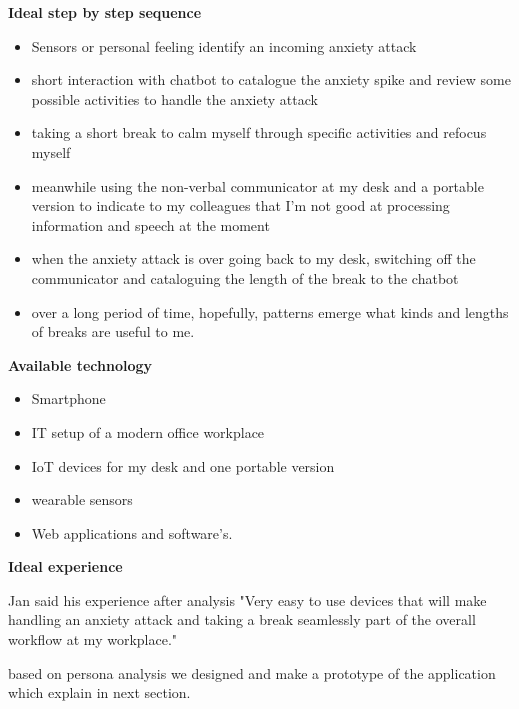 \textbf{Ideal step by step sequence}
\begin{itemize}
    \item Sensors or personal feeling identify an incoming anxiety attack 
    \item short interaction with chatbot to catalogue the anxiety spike and review some possible activities to handle the anxiety attack 
    \item taking a short break to calm myself through specific activities and refocus myself 
    \item meanwhile using the non-verbal communicator at my desk and a portable version to indicate to my colleagues that I’m not good at processing information and speech at the moment 
    \item when the anxiety attack is over going back to my desk, switching off the communicator and cataloguing the length of the break to the chatbot 
    \item over a long period of time, hopefully, patterns emerge what kinds and lengths of breaks are useful to me.
\end{itemize}
\textbf{Available technology}
\begin{itemize}
    \item Smartphone
    \item IT setup of a modern office workplace
    \item IoT devices for my desk and one portable version
    \item wearable sensors
    \item Web applications and software's.
\end{itemize}
\textbf{Ideal experience}

Jan said his experience after analysis "Very easy to use devices that will make handling an anxiety attack and taking a break seamlessly part of the overall workflow at my workplace."

based on persona analysis we designed and make a prototype of the application which explain in next section.

